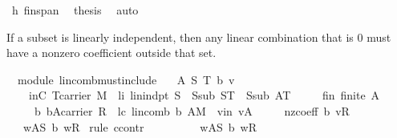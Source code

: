 \begin{isabellebody}
\ h{}\ fin{\isacharunderscore}span\ \isamarkupfalse%
\ {\isacharquery}thesis\ \isamarkupfalse%
\ auto\isanewline
{}\isamarkupfalse%
%
\endisatagproof
{\isafoldproof}%
%
\isadelimproof
%
\endisadelimproof
%
\begin{isamarkuptext}%
If a subset is linearly independent, then any linear combination that is 0 must have a 
nonzero coefficient outside that set.%
\end{isamarkuptext}%
\isamarkuptrue%
\isamarkupfalse%
\ {\isacharparenleft}\ module{\isacharparenright}\ lincomb{\isacharunderscore}must{\isacharunderscore}include{\isacharcolon}\isanewline
\ \ \ A\ S\ T\ b\ v\isanewline
\ \ \ \ inC{\isacharcolon}\ {\isachardoublequoteopen}T{\isasymsubseteq}carrier\ M{\isachardoublequoteclose}\ \ li{\isacharcolon}\ {\isachardoublequoteopen}lin{\isacharunderscore}indpt\ S{\isachardoublequoteclose}\ \ Ssub{\isacharcolon}\ {\isachardoublequoteopen}S{\isasymsubseteq}T{\isachardoublequoteclose}\ \ Ssub{\isacharcolon}\ {\isachardoublequoteopen}A{\isasymsubseteq}T{\isachardoublequoteclose}\isanewline
\ \ \ \ \ fin{\isacharcolon}\ {\isachardoublequoteopen}finite\ A{\isachardoublequoteclose}\isanewline
\ \ \ \ \ b{\isacharcolon}\ {\isachardoublequoteopen}b{\isasymin}A{\isasymrightarrow}carrier\ R{\isachardoublequoteclose}\ \ lc{\isacharcolon}\ {\isachardoublequoteopen}lincomb\ b\ A{\isacharequal}{\isasymzero}\isactrlbsub M\isactrlesub {\isachardoublequoteclose}\ \ v{\isacharunderscore}in{\isacharcolon}\ {\isachardoublequoteopen}v{\isasymin}A{\isachardoublequoteclose}\isanewline
\ \ \ \ \ nz{\isacharunderscore}coeff{\isacharcolon}\ {\isachardoublequoteopen}b\ v{\isasymnoteq}{\isasymzero}\isactrlbsub R\isactrlesub {\isachardoublequoteclose}\isanewline
\ \ \ {\isachardoublequoteopen}{\isasymexists}w{\isasymin}A{\isacharminus}S{\isachardot}\ b\ w{\isasymnoteq}{\isasymzero}\isactrlbsub R\isactrlesub {\isachardoublequoteclose}\isanewline
%
\isadelimproof
%
\endisadelimproof
%
\isatagproof
{}\isamarkupfalse%
\ {\isacharparenleft}rule\ ccontr{\isacharparenright}\ \isanewline
\ \ \isanewline
\ \ \isamarkupfalse%
\ {}{\isacharcolon}\ {\isachardoublequoteopen}{\isasymnot}{\isacharparenleft}{\isasymexists}\ w{\isasymin}A{\isacharminus}S{\isachardot}\ b\ w{\isasymnoteq}{\isasymzero}\isactrlbsub R\isactrlesub {\isacharparenright}{\isachardoublequoteclose}\isanewline

\end{isabellebody}

